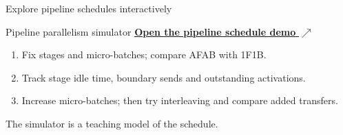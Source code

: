 \documentclass[handout]{beamer}
\begin{document}
\begin{frame}{Explore pipeline schedules interactively}
  \begin{block}{Pipeline parallelism simulator}
    \href{https://brain-bzh.github.io/llm-course/demos/pipeline-parallelism.html}{\textbf{Open the pipeline schedule demo} $\nearrow$}
  \end{block}
  \begin{enumerate}
    \item Fix stages and micro-batches; compare AFAB with 1F1B.
    \item Track stage idle time, boundary sends and outstanding activations.
    \item Increase micro-batches; then try interleaving and compare added transfers.
  \end{enumerate}
  \small The simulator is a teaching model of the schedule.
\end{frame}
\end{document}

